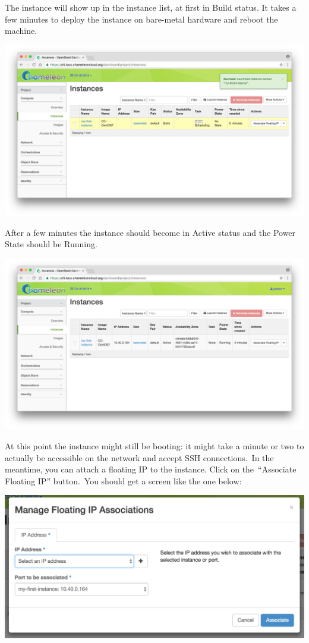 The instance will show up in the instance list, at first in Build
status. It takes a few minutes to deploy the instance on bare-metal
hardware and reboot the machine.

\includegraphics[width=\columnwidth]{images/chameleon/Screen-Shot-2016-10-26-at-15-53-31.png}

After a few minutes the instance should become in Active status and the
Power State should be Running.

\includegraphics[width=\columnwidth]{images/chameleon/Screen-Shot-2016-10-26-at-16-22-38.png}

At this point the instance might still be booting: it might take a
minute or two to actually be accessible on the network and accept SSH
connections.~In the meantime, you can attach a floating IP to the
instance. Click on the~``Associate Floating IP'' button.~You should get
a screen like the one below:

\includegraphics[width=\columnwidth]{images/chameleon/Screen-Shot-2016-10-26-at-16-25-04.png}

